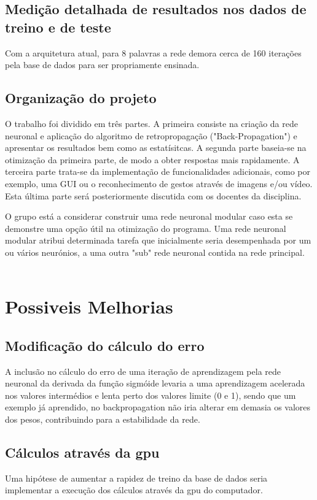 \documentclass[10pt,a4paper]{article}
\begin{document}
\subsection{Medição detalhada de resultados nos dados de treino e de teste}
\subitem

Com a arquitetura atual, para 8 palavras a rede demora cerca de 160 iterações pela base de dados para ser propriamente ensinada.

\subsection{Organização do projeto}
\subitem

O trabalho foi dividido em três partes. 
A primeira consiste na criação da rede neuronal e aplicação do algoritmo de retropropagação ("Back-Propagation") e apresentar os resultados bem como as estatísitcas.
A segunda parte baseia-se na otimização da primeira parte, de modo a obter respostas mais rapidamente.
A terceira parte trata-se da implementação de funcionalidades adicionais, como por exemplo, uma GUI ou o reconhecimento de gestos através de imagens e/ou vídeo. Esta última parte será posteriormente discutida com os docentes da disciplina.

O grupo está a considerar construir uma rede neuronal modular caso esta se demonstre uma opção útil na otimização do programa. Uma rede neuronal modular atribui determinada tarefa que inicialmente seria desempenhada por um ou vários neurónios, a uma outra "sub" rede neuronal contida na rede principal.
\\ \\

\section{Possiveis Melhorias}
\subsection{Modificação do cálculo do erro}
A inclusão no cálculo do erro de uma iteração de aprendizagem pela rede neuronal da derivada da função sigmóide levaria a uma aprendizagem acelerada nos valores intermédios e lenta perto dos valores limite (0 e 1), sendo que um exemplo já aprendido, no backpropagation não iria alterar em demasia os valores dos pesos, contribuindo para a estabilidade da rede. 

\subsection{Cálculos através da gpu}
Uma hipótese de aumentar a rapidez de treino da base de dados seria implementar a execução dos cálculos através da gpu do computador.
\end{document}
